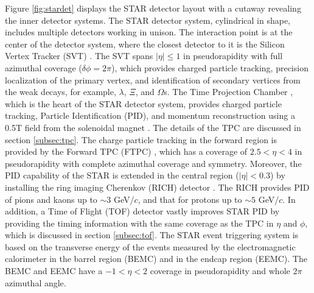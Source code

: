 


Figure \ref{fig:stardet} displays the STAR detector layout with a cutaway revealing the inner detector systems. The STAR detector system, cylindrical in shape, includes multiple detectors working in unison. The interaction point is at the center of the detector system, where the closest detector to it is the Silicon Vertex Tracker (SVT) \cite{STAR:2002bzu}. The SVT spans $|\eta|\leq 1$ in pseudorapidity with full azimuthal coverage ($\delta\phi=2\pi$), which provides charged particle tracking, precision localization of the primary vertex, and identification of secondary vertices from the weak decays, for example, $\lambda$, $\Xi$, and $\Omega$s. The Time Projection Chamber \cite{Anderson:2003ur}, which is the heart of the STAR detector system, provides charged particle tracking, Particle Identification (PID), and momentum reconstruction using a 0.5T field from the solenoidal magnet \cite{STAR:1992kiw}. The details of the TPC are discussed in section \ref{subsec:tpc}. The charge particle tracking in the forward region is provided by the Forward TPC (FTPC) \cite{Ackermann:2002yx}, which has a coverage of $2.5 <\eta < 4$ in pseudorapidity with complete azimuthal coverage and symmetry. Moreover, the PID capability of the STAR is extended in the central region ($|\eta|<0.3$) by installing the ring imaging Cherenkov (RICH) detector \cite{STAR:2002aln}. The RICH provides PID of pions and kaons up to $\sim 3$ GeV/$c$, and that for protons up to $\sim 5$ GeV/$c$. In addition, a Time of Flight (TOF) \cite{STAR:tof} detector vastly improves STAR PID by providing the timing information with the same coverage as the TPC in $\eta$ and $\phi$, which is discussed in section \ref{subsec:tof}.    
The STAR event triggering system is based on the transverse energy of the events measured by the electromagnetic calorimeter in the barrel region (BEMC) \cite{STAR:2002ymp} and in the endcap region  (EEMC)\cite{STAR:2002eml}. The BEMC and EEMC have a $-1<\eta<2$ coverage in pseudorapidity and whole $2\pi$ azimuthal angle.


